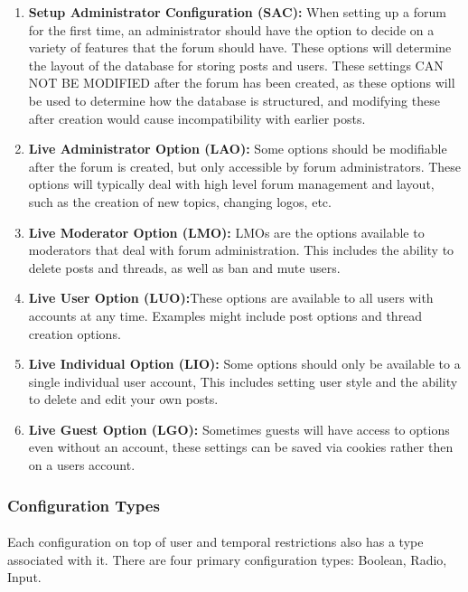 \documentclass[]{article}
\begin{document}
\begin{enumerate}
    \item \textbf{Setup Administrator Configuration (SAC):} When setting up a forum for the first time, an administrator should have the option to decide on a variety of features that the forum should have. These options will determine the layout of the database for storing posts and users. These settings CAN NOT BE MODIFIED after the forum has been created, as these options will be used to determine how the database is structured, and modifying these after creation would cause incompatibility with earlier posts.   
    \item \textbf{Live Administrator Option (LAO):} Some options should be modifiable after the forum is created, but only accessible by forum administrators. These options will typically deal with high level forum management and layout, such as the creation of new topics, changing logos, etc. 
    \item \textbf{Live Moderator Option (LMO):} LMOs are the options available to moderators that deal with forum administration. This includes the ability to delete posts and threads, as well as ban and mute users. 
    \item \textbf{Live User Option (LUO):}These options are available to all users with accounts at any time. Examples might include post options and thread creation options.  
    \item \textbf{Live Individual Option (LIO):} Some options should only be available to a single individual user account, This includes setting user style and the ability to delete and edit your own posts.  
    \item \textbf{Live Guest Option (LGO):} Sometimes guests will have access to options even without an account, these settings can be saved via cookies rather then on a users account. 
\end{enumerate}

\subsubsection{Configuration Types}\label{configTypes}
\paragraph{}
Each configuration on top of user and temporal restrictions also has a type associated with it. There are four primary configuration types: Boolean, Radio, Input.
\end{document}
